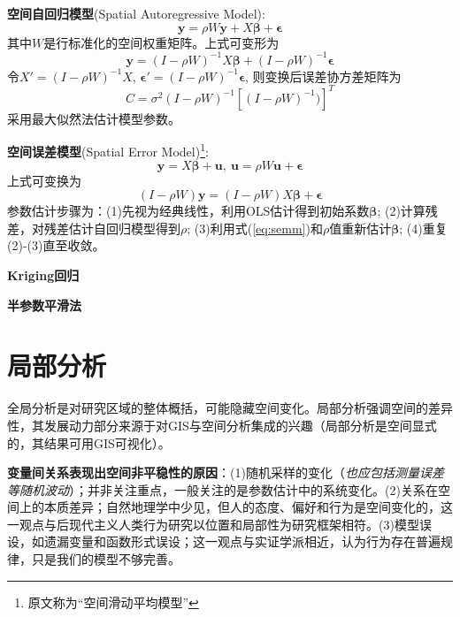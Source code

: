 \par \textbf{空间自回归模型}(Spatial Autoregressive Model):
\begin{equation}
\mathbf{y}=\rho W \mathbf{y}+ X\boldsymbol{\beta}+\boldsymbol{\epsilon}
\end{equation}
其中$W$是行标准化的空间权重矩阵。上式可变形为
\begin{equation}
    \mathbf{y}=(I-\rho W)^{-1}X\boldsymbol{\beta}+(I-\rho W)^{-1}\boldsymbol{\epsilon}
\end{equation}
令$X'=(I-\rho W)^{-1}X$, $\boldsymbol{\epsilon}'=(I-\rho W)^{-1}\boldsymbol{\epsilon}$, 则变换后误差协方差矩阵为
\begin{equation}
    C = \sigma^2 (I-\rho W)^{-1}[(I-\rho W)^{-1})]^T
\end{equation}
采用最大似然法估计模型参数。

\par \textbf{空间误差模型}(Spatial Error Model)\footnote{原文称为“空间滑动平均模型”}:
\begin{equation}
\mathbf{y}=X\boldsymbol{\beta}+\mathbf{u},\ \mathbf{u}=\rho W\mathbf{u}+\boldsymbol{\epsilon}
\end{equation}
上式可变换为
\begin{equation}
(I-\rho W)\mathbf{y}=(I-\rho W)X\boldsymbol{\beta}+\boldsymbol{\epsilon}
\label{eq:semm}
\end{equation}
参数估计步骤为：(1)先视为经典线性，利用OLS估计得到初始系数$\boldsymbol{\beta}$; (2)计算残差，对残差估计自回归模型得到$\rho$; (3)利用式(\ref{eq:semm})和$\rho$值重新估计$\boldsymbol{\beta}$; (4)重复(2)-(3)直至收敛。

\par \textbf{Kriging回归}

\par \textbf{半参数平滑法}

\section{局部分析}

\par 全局分析是对研究区域的整体概括，可能隐藏空间变化。局部分析强调空间的差异性，其发展动力部分来源于对GIS与空间分析集成的兴趣（局部分析是空间显式的，其结果可用GIS可视化）。

\par \textbf{变量间关系表现出空间非平稳性的原因}：(1)随机采样的变化（\emph{也应包括测量误差等随机波动}）；并非关注重点，一般关注的是参数估计中的系统变化。(2)关系在空间上的本质差异；自然地理学中少见，但人的态度、偏好和行为是空间变化的，这一观点与后现代主义人类行为研究以位置和局部性为研究框架相符。(3)模型误设，如遗漏变量和函数形式误设；这一观点与实证学派相近，认为行为存在普遍规律，只是我们的模型不够完善。

